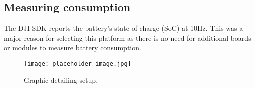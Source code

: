 \subsection{Measuring consumption}
The DJI SDK reports the battery's state of charge (SoC) at 10Hz. This was a major reason for selecting this platform as there is no need for additional boards or modules to measure battery consumption.

\begin{figure}[ht]
	\centering
	\texttt{[image: placeholder-image.jpg]}
	\caption{Graphic detailing setup.}
\end{figure}
